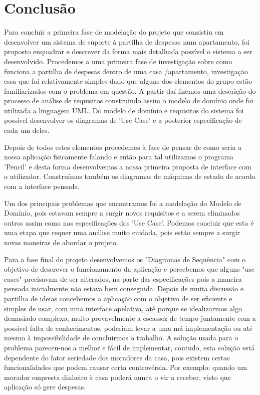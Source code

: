 \chapter{Conclusão}

Para concluir a primeira fase de modelação do projeto que consistiu em  desenvolver um sistema de suporte à partilha de despesas num apartamento, foi  proposto enquadrar e descrever da forma mais detalhada possível o sistema a ser desenvolvido. Procedemos a uma primeira fase de investigação sobre como funciona a partilha de despesas dentro de uma casa /apartamento, investigação essa que foi relativamente simples dado que alguns dos elementos do grupo estão familiarizados com o problema em questão. A partir daí fizemos uma descrição do processo de análise de requisitos construindo assim o modelo de domínio onde foi utilizada a linguagem UML. Do modelo de domínio e requisitos do sistema foi possível desenvolver os diagramas de 'Use Case' e a posterior especificação de cada um deles. 

Depois de todos estes elementos procedemos à fase de pensar de como seria a nossa aplicação fisicamente falando e então para tal utilizamos o programa 'Pencil' e desta forma desenvolvemos a nossa primeira proposta de interface com o utilizador. Construímos também os diagramas de máquinas de estado de acordo com a interface pensada.

Um dos principais problemas que encontramos foi a modelação do Modelo de Domínio, pois estavam sempre a surgir novos requisitos e a serem eliminados outros assim como nas especificações dos 'Use Case'. Podemos concluir que esta é uma etapa que requer uma análise muito cuidada, pois estão sempre a surgir novas maneiras de abordar o projeto. 


Para a fase final do projeto desenvolvemos os "Diagramas de Sequência" com o objetivo de descrever o funcionamento da aplicação e percebemos que alguns "use cases" precisavam de ser alterados, na parte das especificações pois a maneira pensada inicialmente não estava bem conseguida.  Depois de muita discussão e partilha de ideias concebemos a aplicação com o objetivo de ser eficiente e simples de usar, com uma interface apelativa, até porque se idealizarmos algo demasiado complexo, muito provavelmente a escassez de tempo juntamente com a possível falta de conhecimentos, poderiam levar a uma má implementação ou até mesmo à impossibilidade de concluirmos o trabalho.
A solução usada para o problema pareceu-nos a melhor e fácil de implementar, contudo, esta solução está dependente do fator seriedade dos moradores da casa, pois existem certas funcionalidades que podem causar certa controvérsia. Por exemplo: quando um morador empresta dinheiro à casa poderá nunca o vir a receber, visto que aplicação só gere despesas. 

